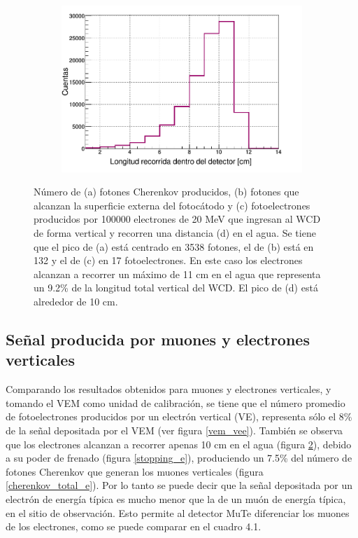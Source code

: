 \documentclass[12pt,oneside,openany,letter]{book}
\begin{document}
\begin{figure}[h!]
\begin{subfigure}{0.45\textwidth}
        \caption{}
        \label{fotoelectrones_vee}
    \end{subfigure}
    \begin{subfigure}{0.45\textwidth}
        \includegraphics[width=\textwidth]{distancia_vee.png}
        \caption{}
        \label{distancia_vee}
    \end{subfigure}
    \caption[Número de fotones Cherenkov producidos en el WCD, fotones que alcanzan la superficie externa del fotoc\'atodo del PMT y fotoelectrones generados por electrones verticales de 20 MeV]{Número de (a) fotones Cherenkov producidos, (b) fotones que alcanzan la superficie externa del fotoc\'atodo y (c) fotoelectrones producidos por 100000 electrones de 20 MeV que ingresan al WCD de forma vertical y recorren una distancia (d) en el agua. Se tiene que el pico de (a) está centrado en 3538 fotones, el de (b) está en 132 y el de (c) en 17 fotoelectrones. En este caso los electrones alcanzan a recorrer un máximo de 11 cm en el agua que representa un 9.2\% de la longitud total vertical del WCD. El pico de (d) está alrededor de 10 cm.}\label{VE_plots}
\end{figure}


\subsection{Señal producida por muones y electrones verticales} 
Comparando los resultados obtenidos para muones y electrones verticales, y tomando el VEM como unidad de calibración, se tiene que el número promedio de fotoelectrones producidos por un electrón vertical (VE), representa sólo el 8\% de la señal depositada por el VEM (ver figura \ref{vem_vee}). También se observa que los electrones alcanzan a recorrer apenas 10 cm en el agua (figura \ref{distancia_vee}), debido a su poder de frenado (figura \ref{stopping_e}), produciendo un 7.5\% del número de fotones Cherenkov que generan los muones verticales (figura \ref{cherenkov_total_e}). Por lo tanto se puede decir que la señal depositada por un electrón de energía típica es mucho menor que la de un muón de energía típica, en el sitio de observación. Esto permite al detector MuTe diferenciar los muones de los electrones, como se puede comparar en el cuadro 4.1.
\end{document}
